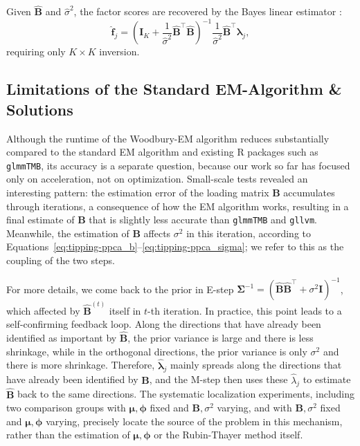 Given $\hat{\mathbf{B}}$ and $\hat{\sigma}^2$, the factor scores are recovered by the Bayes linear estimator \citep{Gelman2013}:
\begin{equation}
\hat{\mathbf{f}}_j = \left( \mathbf{I}_K + \frac{1}{\hat{\sigma}^2} \hat{\mathbf{B}}^\top \hat{\mathbf{B}} \right)^{-1} \frac{1}{\hat{\sigma}^2} \hat{\mathbf{B}}^\top \hat{\boldsymbol{\lambda}}_j ,
\label{eq: Bayeslinearestimator}
\end{equation}
requiring only $K\times K$ inversion.  

\subsection{Limitations of the Standard EM-Algorithm \& Solutions}

Although the runtime of the Woodbury-EM algorithm reduces substantially compared to the standard EM algorithm and existing R packages such as \texttt{glmmTMB}, its accuracy is a separate question, because our work so far has focused only on acceleration, not on optimization.
Small-scale tests revealed an interesting pattern: the estimation error of the loading matrix $\mathbf{B}$ accumulates through iterations, a consequence of how the EM algorithm works, resulting in a final estimate of $\mathbf{B}$ that is slightly less accurate than \texttt{glmmTMB} and \texttt{gllvm}.
Meanwhile, the estimation of $\mathbf{B}$ affects $\sigma^{2}$ in this iteration, according to Equations~\eqref{eq:tipping-ppca_b}--\eqref{eq:tipping-ppca_sigma}; we refer to this as the coupling of the two steps.

For more details, we come back to the prior in E-step $\bm{\Sigma}^{-1}=\left(\hat{\mathbf{B}}\hat{\mathbf{B}}^{\top}+\sigma^{2}\mathbf{I}\right)^{-1}$, which affected by $\hat{\mathbf{B}}^{(t)}$ itself in $t$-th iteration. In practice, this point leads to a self-confirming feedback loop. Along the directions that have already been identified as important by $\hat{\mathbf{B}}$, the prior variance is large and there is less shrinkage, while in the orthogonal directions, the prior variance is only $\sigma^{2}$ and there is more shrinkage. Therefore, $\hat{\bm{\lambda}}_{j}$ mainly spreads along the directions that have already been identified by $\hat{\mathbf{B}}$, and the M-step then uses these $\hat{\lambda}_j$ to estimate $\hat{\mathbf{B}}$ back to the same directions. The systematic localization experiments, including two comparison groups with $\bm{\mu},\bm{\phi}$ fixed and $\mathbf{B},\sigma^2$ varying, and with $\mathbf{B},\sigma^2$ fixed and $\bm{\mu},\bm{\phi}$ varying, precisely locate the source of the problem in this mechanism, rather than the estimation of $\bm{\mu},\bm{\phi}$ or the Rubin-Thayer method itself.

